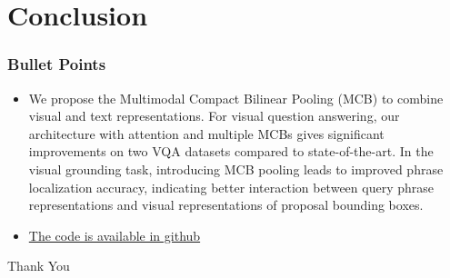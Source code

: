 \documentclass{beamer}
\begin{document}
\section{Conclusion} 
\begin{frame}
\frametitle{Bullet Points}
\begin{itemize}
\item We propose the Multimodal Compact Bilinear Pooling (MCB) to combine visual and text representations. For visual question answering, our architecture with attention and multiple MCBs gives significant improvements on two VQA datasets compared to state-of-the-art. In the visual grounding task, introducing MCB pooling leads to improved phrase localization accuracy, indicating better interaction between query phrase representations and visual representations of proposal bounding boxes.
\item \href{https://github.com/akirafukui/vqa-mcb}{The code is available in \color{blue}github} \color{black}
\end{itemize}
\end{frame}


\begin{frame}
\Huge{\centerline{Thank You}}
\end{frame}
\end{document}
